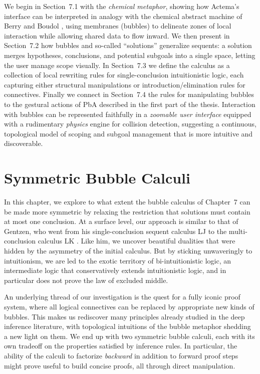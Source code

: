 \documentclass[11pt]{article}
\begin{document}
We begin in Section~7.1 with the \emph{chemical metaphor}, showing how Actema's interface can be interpreted in analogy with the chemical abstract machine of Berry and Boudol \cite{berry_chemical_1989}, using membranes (bubbles) to delineate zones of local interaction while allowing shared data to flow inward. We then present in Section~7.2 how bubbles and so-called ``solutions'' generalize sequents: a solution merges hypotheses, conclusions, and potential subgoals into a single space, letting the user manage scope visually. In Section~7.3 we define the calculus as a collection of local rewriting rules for single-conclusion intuitionistic logic, each capturing either structural manipulations or introduction/elimination rules for connectives. Finally we connect in Section~7.4 the rules for manipulating bubbles to the gestural actions of PbA described in the first part of the thesis. Interaction with bubbles can be represented faithfully in a \emph{zoomable user interface} \cite{perlinPadAlternativeApproach1993} equipped with a rudimentary \emph{physics} engine for collision detection, suggesting a continuous, topological model of scoping and subgoal management that is more intuitive and discoverable.

\section{Symmetric Bubble Calculi}

In this chapter, we explore to what extent the bubble calculus of Chapter~7 can be made more symmetric by relaxing the restriction that solutions must contain at most one conclusion. At a surface level, our approach is similar to that of Gentzen, who went from his single-conclusion sequent calculus LJ to the multi-conclusion calculus LK \cite{gentzen_untersuchungen_1935}. Like him, we uncover beautiful dualities that were hidden by the asymmetry of the initial calculus. But by sticking unwaveringly to intuitionism, we are led to the exotic territory of bi-intuitionistic logic, an intermediate logic that conservatively extends intuitionistic logic, and in particular does not prove the law of excluded middle.

An underlying thread of our investigation is the quest for a fully iconic proof system, where all logical connectives can be replaced by appropriate new kinds of bubbles. This makes us rediscover many principles already studied in the deep inference literature, with topological intuitions of the bubble metaphor shedding a new light on them. We end up with two symmetric bubble calculi, each with its own tradeoff on the properties satisfied by inference rules. In particular, the ability of the calculi to factorize \emph{backward} in addition to forward proof steps might prove useful to build concise proofs, all through direct manipulation.
\\
\end{document}
